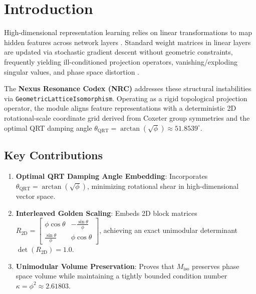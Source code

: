 \section{Introduction}

High-dimensional representation learning relies on linear transformations to map hidden features across network layers \cite{strang1988linear}. Standard weight matrices in linear layers are updated via stochastic gradient descent without geometric constraints, frequently yielding ill-conditioned projection operators, vanishing/exploding singular values, and phase space distortion \cite{golub2013matrix}.

The \textbf{Nexus Resonance Codex (NRC)} addresses these structural instabilities via \texttt{GeometricLatticeIsomorphism}. Operating as a rigid topological projection operator, the module aligns feature representations with a deterministic 2D rotational-scale coordinate grid derived from Coxeter group symmetries \cite{coxeter1973regular} and the optimal QRT damping angle $\theta_{\text{QRT}} = \arctan(\sqrt{\phi}) \approx 51.8539^\circ$.

\subsection{Key Contributions}
\begin{enumerate}[label=\textbf{\arabic*.}]
    \item \textbf{Optimal QRT Damping Angle Embedding}: Incorporates $\theta_{\text{QRT}} = \arctan(\sqrt{\phi})$, minimizing rotational shear in high-dimensional vector space.
    \item \textbf{Interleaved Golden Scaling}: Embeds 2D block matrices $R_{2\text{D}} = \begin{bmatrix} \phi \cos\theta & -\frac{\sin\theta}{\phi} \\ \frac{\sin\theta}{\phi} & \phi \cos\theta \end{bmatrix}$, achieving an exact unimodular determinant $\det(R_{2\text{D}}) = 1.0$.
    \item \textbf{Unimodular Volume Preservation}: Proves that $M_{\text{iso}}$ preserves phase space volume while maintaining a tightly bounded condition number $\kappa = \phi^2 \approx 2.61803$.
\end{enumerate}
